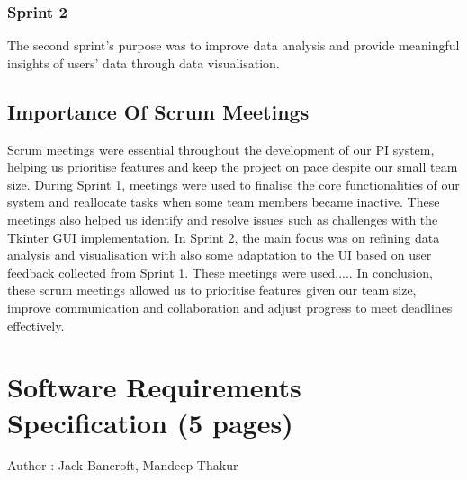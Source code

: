 \documentclass[12pt,a4paper]{article}
\begin{document}
\subsubsection{Sprint 2}
The second sprint's purpose was to improve data analysis and provide meaningful insights of users' data through data visualisation.
\subsection{Importance Of Scrum Meetings}
Scrum meetings were essential throughout the development of our PI system, helping us prioritise features and keep the project on pace despite our small team size. During Sprint 1, meetings were used to finalise the core functionalities of our system and reallocate tasks when some team members became inactive. These meetings also helped us identify and resolve issues such as challenges with the Tkinter GUI implementation. In Sprint 2, the main focus was on refining data analysis and visualisation with also some adaptation to the UI based on user feedback collected from Sprint 1. These meetings were used..... In conclusion, these scrum meetings allowed us to prioritise features given our team size, improve communication and collaboration and adjust progress to meet deadlines effectively.


\label{sec:agile}

\newpage
\section{Software Requirements Specification (5 pages)}
Author  : Jack Bancroft, Mandeep Thakur
\label{sec:requirements}
\end{document}
